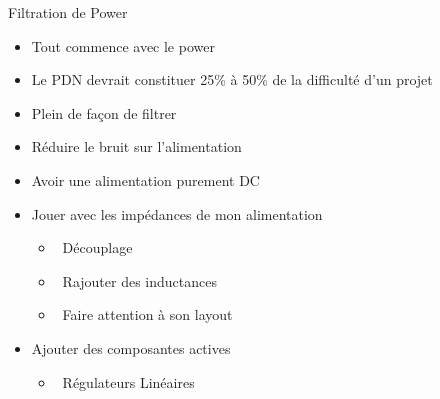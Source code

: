\begin{frame}{Filtration de Power}
    \begin{itemize}
        \item Tout commence avec le power
        \item Le PDN devrait constituer 25\% à 50\% de la difficulté d'un projet
        \bigskip
        \item Plein de façon de filtrer
        \item Réduire le bruit sur l'alimentation
        \item Avoir une alimentation purement DC
        \bigskip
        \item<2-> Jouer avec les impédances de mon alimentation
        \begin{itemize}
            \item<2->[] \textcolor{UDSgreenFierte}{\faEquals} ~Découplage 
            \item<2->[] \textcolor{UDSgreenFierte}{\faSync} ~Rajouter des inductances
            \item<2->[] \textcolor{UDSgreenFierte}{\faPuzzlePiece} ~Faire attention à son layout 
        \end{itemize}
        \item<2-> Ajouter des composantes actives
        \begin{itemize}
            \item<2->[] \textcolor{UDSgreenFierte}{\faRulerHorizontal} ~Régulateurs Linéaires
        \end{itemize}
    \end{itemize}
\end{frame}

